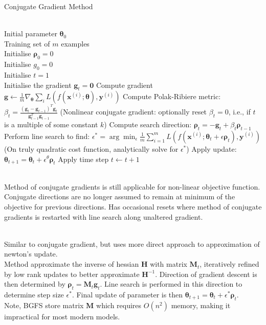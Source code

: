 \begin{breakablealgorithm}
\caption{Conjugate Gradient Method}
\begin{algorithmic}
\Require \\
Initial parameter $\bm{\theta}_0$\\
Training set of $m$ examples\\
Initialise $\bm{\rho}_0 = 0$\\
Initialise $g_0 = 0$\\
Initialise $t = 1$\\

\State Initialise the gradient $\bm{g}_t = \bm{0}$
\State Compute gradient $\bm{g} \leftarrow \frac{1}{m} \nabla_{\bm{\theta}} \sum_i L(f(\bm{x}^{(i)}; \bm{\theta}), \bm{y}^{(i)})$
\State Compute Polak-Ribiere metric: $\beta_t = \frac{(\bm{g}_t - \bm{g}_{t-1})^T \bm{g}_t}{\bm{g}_{t-1}^T \bm{g}_{t-1}}$
\State (Nonlinear conjugate gradient: optionally reset $\beta_t = 0$, i.e., if $t$ is a multiple of some constant $k$)
\State Compute search direction: $\bm{\rho}_t = -\bm{g}_t + \beta_t \bm{\rho}_{t-1}$
\State Perform line search to find: $\epsilon^{*} = \arg \min_{\epsilon} \frac{1}{m} \sum_{i=1}^m L(f(\bm{x}^{(i)}; \bm{\theta}_t + \epsilon \bm{\rho}_t), \bm{y}^{(i)})$
\State (On truly quadratic cost function, analytically solve for $\epsilon^{*}$)
\State Apply update: $\bm{\theta}_{t+1} = \bm{\theta}_{t} + \epsilon^{\theta} \bm{\rho}_t$
\State Apply time step $t \leftarrow t + 1$
\EndWhile
\end{algorithmic}
\end{breakablealgorithm}

\begin{remark} \\
Method of conjugate gradients is still applicable for non-linear objective function.\\
Conjugate directions are no longer assumed to remain at minimum of the objective for previous directions. Has occasional resets where method of conjugate gradients is restarted with line search along unaltered gradient.
\end{remark}

\begin{remark} \\
Similar to conjugate gradient, but uses more direct approach to approximation of newton's update.\\
Method approximate the inverse of hessian $\bm{H}$ with matrix $\bm{M}_t$, iteratively refined by low rank updates to better approximate $\bm{H}^{-1}$. Direction of gradient descent is then determined by $\bm{\rho}_t = \bm{M}_t \bm{g}_t$. Line search is performed in this direction to determine step size $\epsilon^{*}$. Final update of parameter is then $\bm{\theta}_{t+1} = \bm{\theta}_t + \epsilon^{*} \bm{\rho}_{t}$.\\
Note, BGFS store matrix $\bm{M}$ which requires $O(n^2)$ memory, making it impractical for most modern models.
\end{remark}

